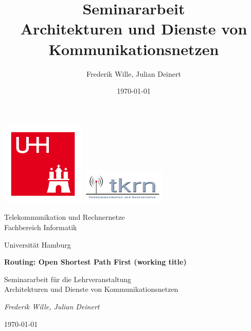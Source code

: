 \documentclass[11pt,a4paper,final]{article}
\title{\LARGE \bf
Seminararbeit\\ Architekturen und Dienste von Kommunikationsnetzen
}
\author{Frederik Wille, Julian Deinert}
\date{\today}
\begin{document}

\begin{titlepage}
	\centering
	\includegraphics[width=0.3\textwidth]{images/uhh_logo.jpg}\hspace{1cm}
	\includegraphics[width=0.3\textwidth]{images/tkrn_logo.jpg}\par
	{\Large Telekommunikation und Rechnernetze \\}
	{\large Fachbereich Informatik\\}
	{\large Universität Hamburg \par}
	\vspace{1.5cm}
	{\huge\bfseries Routing: Open Shortest Path First (working title)\par}
	\vspace{1.5cm}
	{\large Seminararbeit für die Lehrveranstaltung \\ \Large Architekturen und Dienste von Kommunikationsnetzen\par}

	\vfill
	\vfill
	{\Large\itshape Frederik Wille, Julian Deinert\par}

	\vfill

	{\large \today\par}
\end{titlepage}
\thispagestyle{empty}
\newpage
\thispagestyle{empty}
\tableofcontents
\newpage
\thispagestyle{empty}
\end{document}
